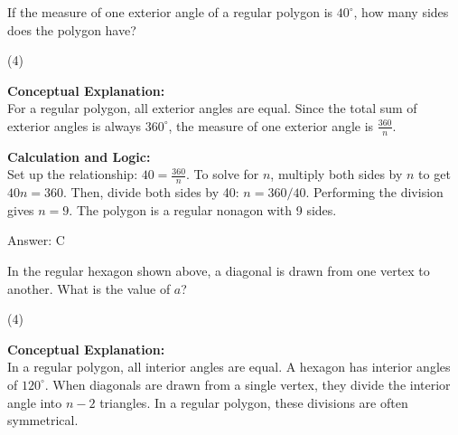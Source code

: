 \documentclass[11pt,paper=a4,answers]{exam}
\begin{document}
\begin{questions}
\question
If the measure of one exterior angle of a regular polygon is $40^\circ$, how many sides does the polygon have?
\begin{tasks}(4)
\end{tasks}

\begin{solution}
\textbf{Conceptual Explanation:} \\
For a regular polygon, all exterior angles are equal. Since the total sum of exterior angles is always $360^\circ$, the measure of one exterior angle is $\frac{360}{n}$.

\vspace{30pt}

\textbf{Calculation and Logic:} \\
Set up the relationship: $40 = \frac{360}{n}$. To solve for $n$, multiply both sides by $n$ to get $40n = 360$. Then, divide both sides by 40: $n = 360 / 40$. Performing the division gives $n = 9$. The polygon is a regular nonagon with 9 sides.

\vspace{30pt}

Answer: \colorbox{yellow!100}{C}
\end{solution}

\vspace{60pt}

\question
\begin{center}
\end{center}
In the regular hexagon shown above, a diagonal is drawn from one vertex to another. What is the value of $a$?
\begin{tasks}(4)
\end{tasks}

\begin{solution}
\textbf{Conceptual Explanation:} \\
In a regular polygon, all interior angles are equal. A hexagon has interior angles of $120^\circ$. When diagonals are drawn from a single vertex, they divide the interior angle into $n-2$ triangles. In a regular polygon, these divisions are often symmetrical.


\end{solution}
\end{questions}
\end{document}
